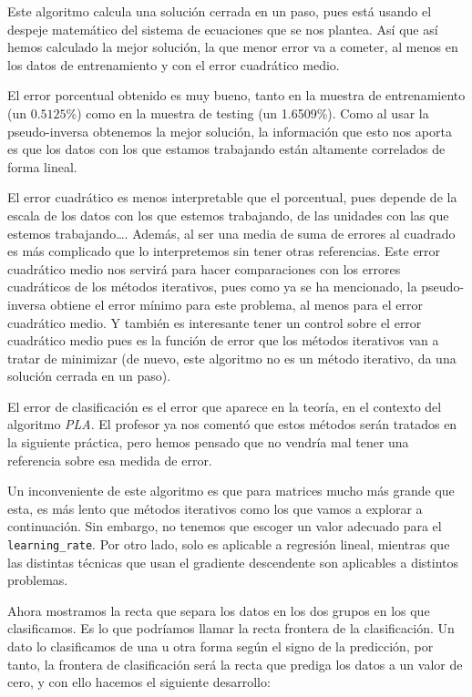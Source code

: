 \documentclass[11pt]{article}
\begin{document}
Este algoritmo calcula una solución cerrada en un paso, pues está usando el despeje matemático del sistema de ecuaciones que se nos plantea. Así que así hemos calculado la mejor solución, la que menor error va a cometer, al menos en los datos de entrenamiento y con el error cuadrático medio.

El error porcentual obtenido es muy bueno, tanto en la muestra de entrenamiento (un $0.5125\%$) como en la muestra de testing (un 1.6509\%). Como al usar la pseudo-inversa obtenemos la mejor solución, la información que esto nos aporta es que los datos con los que estamos trabajando están altamente correlados de forma lineal.

El error cuadrático es menos interpretable que el porcentual, pues depende de la escala de los datos con los que estemos trabajando, de las unidades con las que estemos trabajando\ldots. Además, al ser una media de suma de errores al cuadrado es más complicado que lo interpretemos sin tener otras referencias. Este error cuadrático medio nos servirá para hacer comparaciones con los errores cuadráticos de los métodos iterativos, pues como ya se ha mencionado, la pseudo-inversa obtiene el error mínimo para este problema, al menos para el error cuadrático medio. Y también es interesante tener un control sobre el error cuadrático medio pues es la función de error que los métodos iterativos van a tratar de minimizar (de nuevo, este algoritmo no es un método iterativo, da una solución cerrada en un paso).

El error de clasificación es el error que aparece en la teoría, en el contexto del algoritmo \emph{PLA}. El profesor ya nos comentó que estos métodos serán tratados en la siguiente práctica, pero hemos pensado que no vendría mal tener una referencia sobre esa medida de error.

Un inconveniente de este algoritmo es que para matrices mucho más grande que esta, es más lento que métodos iterativos como los que vamos a explorar a continuación. Sin embargo, no tenemos que escoger un valor adecuado para el \lstinline{learning_rate}. Por otro lado, solo es aplicable a regresión lineal, mientras que las distintas técnicas que usan el gradiente descendente son aplicables a distintos problemas.

Ahora mostramos la recta que separa los datos en los dos grupos en los que clasificamos. Es lo que podríamos llamar la recta frontera de la clasificación. Un dato lo clasificamos de una u otra forma según el signo de la predicción, por tanto, la frontera de clasificación será la recta que prediga los datos a un valor de cero, y con ello hacemos el siguiente desarrollo:
\end{document}

